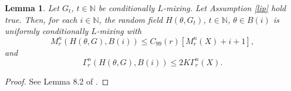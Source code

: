 \documentclass[a4paper,draft]{article}
\newtheorem{lemma}[theorem]{Lemma}
\begin{document}
\begin{lemma}\label{below} Let $G_t$,
$t\in\mathbb{N}$ be conditionally
$L$-mixing. Let Assumption \ref{lip} hold true. Then,
for each $i\in\mathbb{N}$, the random field $H(\theta,G_t)$,
$t\in\mathbb{N}$, $\theta\in B(i)$ is uniformly conditionally $L$-mixing
with
\begin{equation}\label{mamma}
M^n_r(H(\theta,G),B(i))\leq C_{99}(r)[M_r^n(X)+i+1],
\end{equation}
and
\begin{equation}\label{gomma}
\Gamma^n_r(H(\theta,G),B(i))\leq 2K\Gamma^n_r(X).
\end{equation}
\end{lemma}
\begin{proof} See Lemma 8.2 of \cite{convex}.
\end{proof}
\end{document}
